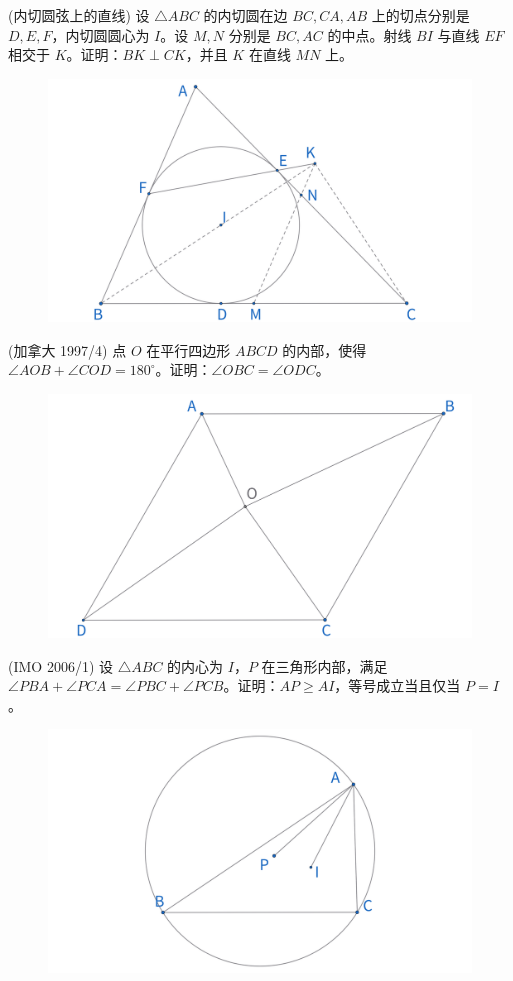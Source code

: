 \begin{exercise}
(内切圆弦上的直线) 设 $\triangle ABC$ 的内切圆在边 $BC, {CA}, {AB}$ 上的切点分别是 $D, E, F$，内切圆圆心为 $I$。设 $M, N$ 分别是 $BC, AC$ 的中点。射线 $BI$ 与直线 $EF$ 相交于 $K$。证明：$BK \perp CK$，并且 $K$ 在直线 $MN$ 上。
\end{exercise}
\begin{figure}[H]
    \centering
    \includegraphics[width=0.7\linewidth]{figures/exercises/010.png}
\end{figure}

\newpage 
\begin{exercise}
(加拿大 1997/4) 点 $O$ 在平行四边形 $ABCD$ 的内部，使得 $\angle AOB + \angle COD = 180^\circ$。证明：$\angle OBC = \angle ODC$。
\end{exercise}
\begin{figure}[H]
    \centering
    \includegraphics[width=0.7\linewidth]{figures/exercises/011.png}
\end{figure}


\begin{exercise}
(IMO 2006/1) 设 $\triangle ABC$ 的内心为 $I$，$P$ 在三角形内部，满足 $\angle PBA + \angle PCA = \angle PBC + \angle PCB$。证明：$AP \geq AI$，等号成立当且仅当 $P = I$。
\end{exercise}
\begin{figure}[H]
    \centering
    \includegraphics[width=0.7\linewidth]{figures/exercises/012.png}
\end{figure}


